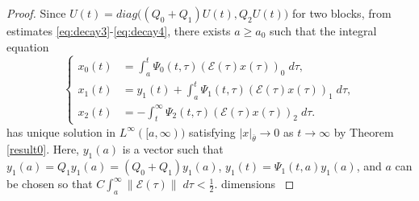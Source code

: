\documentclass[a4paper,11pt]{article}
\def\blue{\color{blue}}
\newcommand{\tu}{{\overline{\theta}}}
\newcommand{\E}{\mathcal{E}}
\newcounter{Theorem}
\theoremstyle{remark}
\begin{document}
\begin{proof}
{\blue
Since $U(t)=diag\big((Q_0+Q_1)U(t), Q_2U(t)\big)$ for two blocks, from estimates \eqref{eq:decay3}-\eqref{eq:decay4}, there exists $a\ge a_0$ such that the integral equation
\begin{equation} \label{integral30}
\left\{ \begin{aligned}
x_0(t) &= \int_a^t \Psi_0(t,\tau) (\E(\tau)x(\tau))_0 \; d\tau,\\
x_1(t) &= y_1(t) + \int_a^t \Psi_1(t,\tau) (\E(\tau)x(\tau))_1 \; d\tau,\\
x_2(t) &= -\int_{t}^\infty \Psi_2(t,\tau) (\E(\tau)x(\tau))_2 \; d\tau.
\end{aligned}\right.
\end{equation}
has unique solution in $L^\infty([a,\infty))$ satisfying $|x|_\tu \rightarrow 0$ as $t \rightarrow \infty$ by Theorem \ref{result0}. Here, $y_1(a)$ is a vector such that $y_1(a)=Q_1y_1(a) = (Q_0+Q_1)y_1(a)$, $y_1(t) = \Psi_1(t,a)y_1(a)$, and $a$ can be chosen so that $C\int_a^\infty \|\E(\tau)\| \;d\tau < \frac{1}{2}$. {\blue dimensions}
}



\end{proof}
\end{document}
